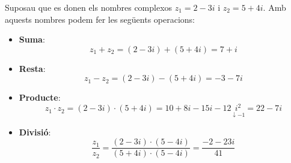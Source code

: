 \begin{theorybox}
	Suposau que es donen els nombres complexos $z_1 = 2-3i$ i $z_2 = 5+4i$. Amb aquests nombres podem fer les següents operacions:
	\begin{itemize}
		\item \textbf{Suma}:  \[ z_1 + z_2 = (2-3i) + (5+4i) = 7 + i\] 
		
		\item \textbf{Resta}: \[ z_1 - z_2 = (2-3i) - (5+4i) = -3 - 7i\]
		
		\item \textbf{Producte}:  \[ z_1 \cdot z_2 = (2-3i) \cdot (5+4i) = 10+8i-15i-12 \underset{\downarrow -1}{i^2} =22 -7i \]
		
		\item \textbf{Divisió}: \[ \frac{z_1} {z_2} = \frac{(2-3i)\cdot (5-4i)}{(5+4i)\cdot(5-4i)}=\frac{-2-23i}{41}\]
	\end{itemize}
\end{theorybox}
 
